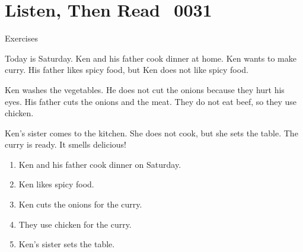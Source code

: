 \documentclass[aspectratio=169,xcolor={dvipsnames,table}]{beamer}
\newcommand{\myaudio}[1]{\href{#1}{\faVolumeUp}}
\begin{document}
\section{Listen, Then Read\,\,\,\,\,{\tiny 0031}\,{\scriptsize \myaudio{./audio/007_negative_do_reading.mp3}}}
\begin{frame}[plain,t]{Exercises}
\vspace*{-4pt}
\begin{tcolorbox}[colframe=ForestGreen,
  colback=NavyBlue!10!white,
  colbacktitle=NavyBlue!40!white,
  coltitle=black, %
before upper={\setlength{\parindent}{1.25em}},
 title={Cooking Dinner with Dad\hfill{\tiny 0031}\quad{\scriptsize \myaudio{./audio/007_negative_do_reading.mp3}}}
]
\noindent{}Today is Saturday. Ken and his father cook dinner at home. Ken wants to make curry. His father likes spicy food, but Ken does not like spicy food.

Ken washes the vegetables. He does not cut the onions because they hurt his eyes. His father cuts the onions and the meat. They do not eat beef, so they use chicken.

Ken's sister comes to the kitchen. She does not cook, but she sets the table. The curry is ready. It smells delicious!
\end{tcolorbox}

\vspace{-4pt}
\vspace{-11pt}
\begin{enumerate}\setlength{\itemsep}{-3.4pt}
\item<2-> Ken and his father cook dinner on Saturday.\hfill{}
\item<2-> Ken likes spicy food.\hfill{}
\item<2-> Ken cuts the onions for the curry.\hfill{}
\item<2-> They use chicken for the curry.\hfill\visible<6->{T}
\item<2-> Ken's sister sets the table.\hfill{}
\end{enumerate}
\end{frame}
\end{document}

